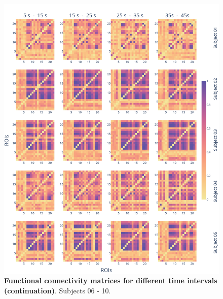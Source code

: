 \documentclass[../main.tex]{subfiles}
\begin{document}
\begin{figure}[htbp]
    \ContinuedFloat %
    \centering
    \includegraphics[width=\textwidth]{chapter3/figures/plv_dynamics_0.png}
    \caption{\textbf{Functional connectivity matrices for different time intervals (continuation)}.
    Subjects 06 - 10.}
\end{figure}
\end{document}
